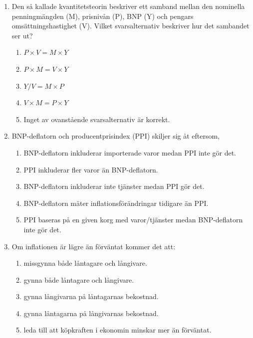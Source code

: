 \documentclass[12pt,a4paper]{article}
\begin{document}
\begin{enumerate}[label=\arabic*.]
    \item Den så kallade kvantitetsteorin beskriver ett samband mellan den nominella penningmängden (M), prisnivån (P), BNP (Y) och pengars omsättningshastighet (V). Vilket svarsalternativ beskriver hur det sambandet ser ut?
    \begin{enumerate}[label=\Alph*.]
        \item $P \times V = M \times Y$
        \item $P \times M = V \times Y$
        \item $Y / V = M \times P$
        \item $V \times M = P \times Y$
        \item Inget av ovanstående svarsalternativ är korrekt.
    \end{enumerate}

    \item BNP-deflatorn och producentprisindex (PPI) skiljer sig åt eftersom,
    \begin{enumerate}[label=\Alph*.]
        \item BNP-deflatorn inkluderar importerade varor medan PPI inte gör det.
        \item PPI inkluderar fler varor än BNP-deflatorn.
        \item BNP-deflatorn inkluderar inte tjänster medan PPI gör det.
        \item BNP-deflatorn mäter inflationsförändringar tidigare än PPI.
        \item PPI baseras på en given korg med varor/tjänster medan BNP-deflatorn inte gör det.
    \end{enumerate}

    \item Om inflationen är lägre än förväntat kommer det att:
    \begin{enumerate}[label=\Alph*.]
        \item missgynna både låntagare och långivare.
        \item gynna både låntagare och långivare.
        \item gynna långivarna på låntagarnas bekostnad.
        \item gynna låntagarna på långivarnas bekostnad.
        \item leda till att köpkraften i ekonomin minskar mer än förväntat.
    \end{enumerate}


\end{enumerate}
\end{document}
